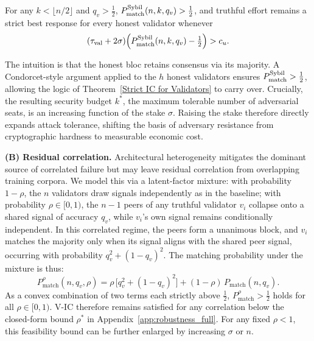 \begin{theorem}
\label{thm:sybil_ic}
For any $k < \lfloor n/2 \rfloor$ and $q_v > \tfrac{1}{2}$, $P_{\textup{match}}^{\textup{Sybil}}(n,k,q_v) > \tfrac{1}{2}$, and truthful effort remains a strict best response for every honest validator whenever
\begin{equation}
\label{eq:ic_sybil}
(\tau_{\textup{val}} + 2\sigma)\Big(P_{\textup{match}}^{\textup{Sybil}}(n,k,q_v) - \tfrac{1}{2}\Big) > c_u.
\end{equation}
\end{theorem}

The intuition is that the honest bloc retains consensus via its majority. A Condorcet-style argument applied to the $h$ honest validators ensures $P_{\textup{match}}^{\textup{Sybil}} > \tfrac{1}{2}$, allowing the logic of Theorem~\ref{Strict IC for Validators} to carry over. Crucially, the resulting security budget $k^*$, the maximum tolerable number of adversarial seats, is an increasing function of the stake $\sigma$. Raising the stake therefore directly expands attack tolerance, shifting the basis of adversary resistance from cryptographic hardness to measurable economic cost.

\vspace{2mm}
\noindent\textbf{(B) Residual correlation.}
Architectural heterogeneity mitigates the dominant source of correlated failure but may leave residual correlation from overlapping training corpora. We model this via a latent-factor mixture: with probability $1-\rho$, the $n$ validators draw signals independently as in the baseline; with probability $\rho \in [0, 1)$, the $n-1$ peers of any truthful validator $v_i$ collapse onto a shared signal of accuracy $q_v$, while $v_i$'s own signal remains conditionally independent. In this correlated regime, the peers form a unanimous block, and $v_i$ matches the majority only when its signal aligns with the shared peer signal, occurring with probability $q_v^2 + (1-q_v)^2$. The matching probability under the mixture is thus:
\begin{equation}
\label{eq:pmatch_corr}
P_{\text{match}}^{\rho}(n, q_v, \rho) = \rho\,\bigl[q_v^2 + (1-q_v)^2\bigr] + (1-\rho)\,P_{\text{match}}(n, q_v).
\end{equation}
As a convex combination of two terms each strictly above $\tfrac{1}{2}$, $P_{\text{match}}^{\rho} > \tfrac{1}{2}$ holds for all $\rho \in [0, 1)$. V-IC therefore remains satisfied for any correlation below the closed-form bound $\rho^*$ in Appendix~\ref{app:robustness_full}. For any fixed $\rho < 1$, this feasibility bound can be further enlarged by increasing $\sigma$ or $n$.

